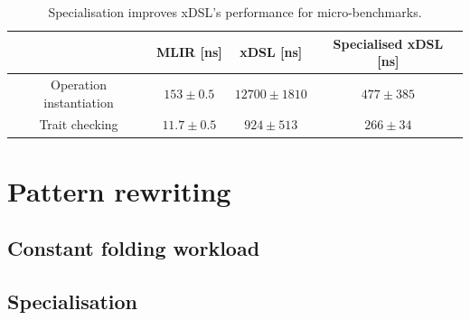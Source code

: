 
\begin{table}[H]
  \caption{Specialisation improves xDSL's performance for micro-benchmarks.}
  \label{tab:ubenchmark-instantiation-optimised}
  \centering
  \begin{tabular}{cccc}
    \toprule
    \textbf{} & \textbf{MLIR [ns]} & \textbf{xDSL [ns]} & \textbf{Specialised xDSL [ns]} \\
    \midrule
    Operation instantiation & $153 \pm 0.5$ & $12700 \pm 1810$ & $477 \pm 385$ \\
    Trait checking & $11.7 \pm 0.5$ & $924 \pm 513$ & $266 \pm 34$\\
    \bottomrule
  \end{tabular}
\end{table}



\section{Pattern rewriting}
\label{sec:specialising-pattern-rewriting}


\subsection{Constant folding workload}
\label{sec:specialising-pattern-rewriting-workload}




\subsection{Specialisation}
\label{sec:specialising-pattern-rewriting-specialisation}



